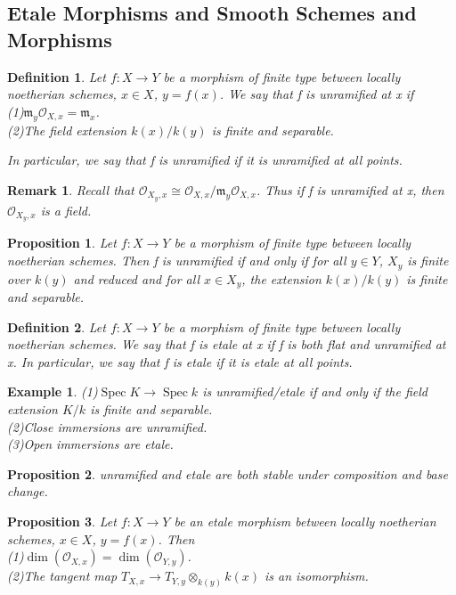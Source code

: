 \documentclass{ctexart}
\newtheorem{definition}{Definition}[section]
\newtheorem{remark}{Remark}[section]
\newtheorem{proposition}{Proposition}[section]
\newtheorem{example}{Example}[section]
\newcommand{\spec}{\operatorname{Spec}}
\begin{document}
\subsection{Etale Morphisms and Smooth Schemes and Morphisms}
\begin{definition}
    Let $f: X \longrightarrow Y$ be a morphism of finite type between locally noetherian schemes, $x\in X$, $y = f(x)$.
    We say that f is unramified at x if \\
    (1)$\mathfrak{m}_{y}\mathcal{O}_{X, x} = \mathfrak{m}_{x}$. \\
    (2)The field extension $k(x)/k(y)$ is finite and separable.
    \par
    In particular, we say that f is unramified if it is unramified at all points.
\end{definition}
\begin{remark}
    Recall that $\mathcal{O}_{X_{y}, x} \cong \mathcal{O}_{X, x}/\mathfrak{m}_{y}\mathcal{O}_{X, x}$.
    Thus if f is unramified at x, then $\mathcal{O}_{X_{y}, x}$ is a field.
\end{remark}
\begin{proposition}
    Let $f: X \longrightarrow Y$ be a morphism of finite type between locally noetherian schemes.
    Then f is unramified if and only if for all $y\in Y$, $X_{y}$ is finite over $k(y)$ and reduced and for all $x\in X_{y}$, the extension $k(x)/k(y)$ is finite and separable.
    \label{Proposition 5.6}
\end{proposition}
\begin{definition}
    Let $f: X \longrightarrow Y$ be a morphism of finite type between locally noetherian schemes.
    We say that f is etale at x if f is both flat and unramified at x.
    In particular, we say that f is etale if it is etale at all points.
\end{definition}
\begin{example}
    (1)$\spec K \longrightarrow \spec k$ is unramified/etale if and only if the field extension $K/k$ is finite and separable. \\
    (2)Close immersions are unramified. \\
    (3)Open immersions are etale.
\end{example}
\begin{proposition}
    unramified and etale are both stable under composition and base change.
    \label{Proposition 5.7}
\end{proposition}
\begin{proposition}
    Let $f: X \longrightarrow Y$ be an etale morphism between locally noetherian schemes, $x\in X$, $y = f(x)$.
    Then \\
    (1)$\dim(\mathcal{O}_{X, x}) = \dim(\mathcal{O}_{Y, y})$. \\
    (2)The tangent map $T_{X, x} \longrightarrow T_{Y, y} \otimes_{k(y)} k(x)$ is an isomorphism.
    \label{Proposition 5.8}
\end{proposition}
\end{document}
